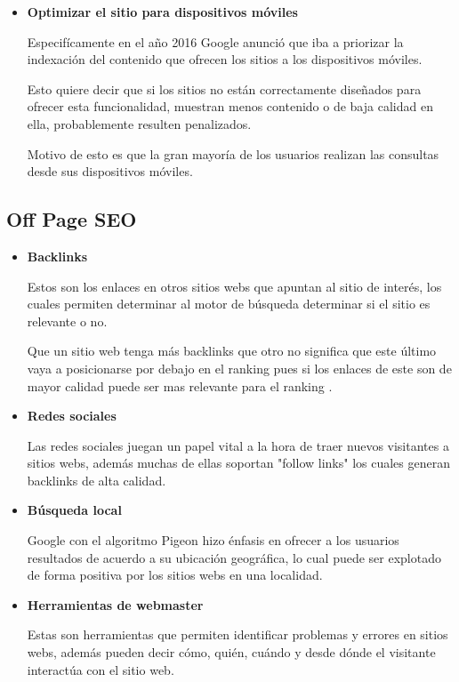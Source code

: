 \documentclass[12pt]{llncs}
\begin{document}
\begin{itemize}
\item \textbf{Optimizar el sitio para dispositivos móviles} \cite{mobile}

Especifícamente en el año 2016 Google anunció que iba a priorizar la indexación del contenido que ofrecen los sitios a los dispositivos móviles.

Esto quiere decir que si los sitios no están correctamente diseñados para ofrecer esta funcionalidad, muestran menos contenido o de baja calidad en ella, probablemente resulten penalizados.

Motivo de esto es que la gran mayoría de los usuarios realizan las consultas desde sus dispositivos móviles.


\end{itemize}

\subsection{Off Page SEO}
\begin{itemize}
\item \textbf{Backlinks}

Estos son los enlaces en otros sitios webs que apuntan al sitio de interés, los cuales permiten determinar al motor de búsqueda determinar si el sitio es relevante o no.

Que un sitio web tenga más backlinks que otro no significa que este último vaya a posicionarse por debajo en el ranking pues si los enlaces de este son de mayor calidad puede ser mas relevante para el ranking \cite{imp_seo}.

\item \textbf{Redes sociales}

Las redes sociales juegan un papel vital a la hora de traer nuevos visitantes a sitios webs, además muchas de ellas soportan "follow links" los cuales generan backlinks de alta calidad.

\item \textbf{Búsqueda local}

Google con el algoritmo Pigeon hizo énfasis en ofrecer a los usuarios resultados de acuerdo a su ubicación geográfica, lo cual puede ser explotado de forma positiva por los sitios webs en una localidad.

\item \textbf{Herramientas de webmaster}

Estas son herramientas que permiten identificar problemas y errores en sitios webs, además pueden decir cómo, quién, cuándo y desde dónde el visitante interactúa con el sitio web.

\end{itemize}
\end{document}
